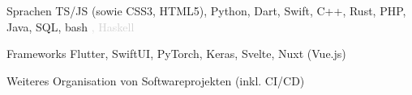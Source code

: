 
\begin{cvskills}
  \cvskill
    {Sprachen} %
    {TS/JS (sowie CSS3, HTML5), Python, Dart, Swift, C++, Rust, PHP, Java, SQL, bash \textcolor{lightgray}{, Haskell}}%

  \cvskill
    {Frameworks} %
    {Flutter, SwiftUI, PyTorch, Keras, Svelte, Nuxt (Vue.js)}%
    
  \cvskill
    {Weiteres} %
    {
        Organisation von Softwareprojekten (inkl. CI/CD)
    }
    
\end{cvskills}
